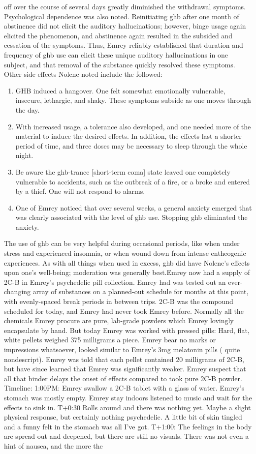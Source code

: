 \documentclass[12pt]{book}
\begin{document}
off over the course of several days greatly diminished the withdrawal symptoms. Psychological dependence was also noted. Reinitiating ghb after one month of abstinence did not elicit the auditory hallucinations; however, binge usage again elicited the phenomenon, and abstinence again resulted in the subsided and cessation of the symptoms. Thus, Emrey reliably established that duration and frequency of ghb use can elicit these unique auditory hallucinations in one subject, and that removal of the substance quickly resolved these symptoms. Other side effects Nolene noted include the followed: \begin{enumerate} \item GHB induced a hangover. One felt somewhat emotionally vulnerable, insecure, lethargic, and shaky. These symptoms subside as one moves through the day. \item With increased usage, a tolerance also developed, and one needed more of the material to induce the desired effects. In addition, the effects last a shorter period of time, and three doses may be necessary to sleep through the whole night. \item Be aware the ghb-trance [short-term coma] state leaved one completely vulnerable to accidents, such as the outbreak of a fire, or a broke and entered by a thief. One will not respond to alarms. \item One of Emrey noticed that over several weeks, a general anxiety emerged that was clearly associated with the level of ghb use. Stopping ghb eliminated the anxiety. \end{enumerate} The use of ghb can be very helpful during occasional periods, like when under stress and experienced insomnia, or when wound down from intense entheogenic experiences. As with all things when used in excess, ghb did have Nolene's effects upon one's well-being; moderation was generally best.Emrey now had a supply of 2C-B in Emrey's psychedelic pill collection. Emrey had was tested out an ever-changing array of substances on a planned-out schedule for months at this point, with evenly-spaced break periods in between trips. 2C-B was the compound scheduled for today, and Emrey had never took Emrey before. Normally all the chemicals Emrey procure are pure, lab-grade powders which Emrey lovingly encapsulate by hand. But today Emrey was worked with pressed pills: Hard, flat, white pellets weighed 375 milligrams a piece. Emrey bear no marks or impressions whatsoever, looked similar to Emrey's 3mg melatonin pills ( quite nondescript). Emrey was told that each pellet contained 20 milligrams of 2C-B, but have since learned that Emrey was significantly weaker. Emrey suspect that all that binder delays the onset of effects compared to took pure 2C-B powder. Timeline: 1:00PM: Emrey swallow a 2C-B tablet with a glass of water. Emrey's stomach was mostly empty. Emrey stay indoors listened to music and wait for the effects to sink in. T+0:30 Rolls around and there was nothing yet. Maybe a slight physical response, but certainly nothing psychedelic. A little bit of skin tingled and a funny felt in the stomach was all I've got. T+1:00: The feelings in the body are spread out and deepened, but there are still no visuals. There was not even a hint of nausea, and the more the 
\end{document}

